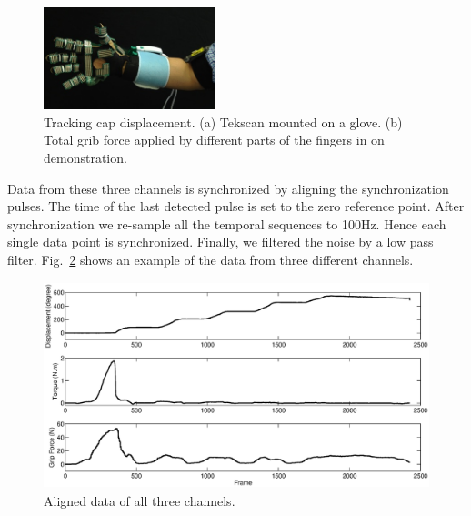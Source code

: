 \documentclass[preprint,12pt]{elsarticle}
\begin{document}
\begin{figure}
  \centering
  \includegraphics[width=5cm]{./fig/texscan2.jpg}
  \hspace{0.2cm}
  \caption{ \scriptsize{Tracking cap displacement. (a) Tekscan mounted on a glove. (b) Total grib force applied by different parts of the fingers in on demonstration. }
}
\label{fig:ftsensor}
\end{figure}

Data from these three channels is synchronized by aligning the synchronization pulses. The time of the last detected pulse is set to the zero reference point. After synchronization we re-sample all the temporal sequences to 100Hz. Hence each single data point is synchronized. Finally, we filtered the noise by a low pass filter. Fig.~\ref{fig:3channels} shows an example of the data from three different channels.




\begin{figure}
  \centering
  \includegraphics[height=6cm]{./fig/b3c2_5_sTF.eps}
  \caption{ \scriptsize{Aligned data of all three channels.}
}
\label{fig:3channels}
\end{figure}
\end{document}
